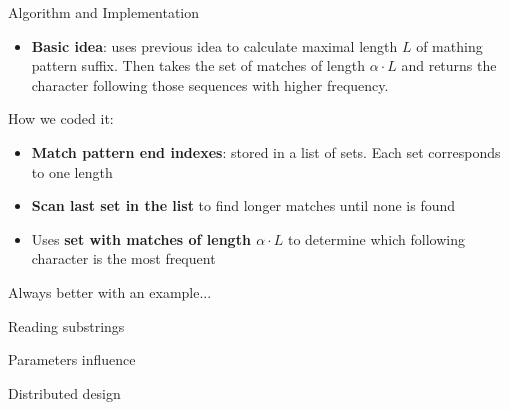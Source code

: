 \documentclass[aspectratio=169]{beamer}
\begin{document}

\begin{frame}{Algorithm and Implementation}
   \begin{itemize}
    \item \textbf{Basic idea}: uses previous idea to calculate maximal length $L$ of mathing pattern suffix. Then takes the set of matches of length $\alpha \cdot L$ and returns the character following those sequences with higher frequency.
  \end{itemize}

  \vspace{\fill}

  How we coded it:
  \begin{itemize}
    \item \textbf{Match pattern end indexes}: stored in a list of sets. Each set corresponds to one length
    \item \textbf{Scan last set in the list} to find longer matches until none is found
    \item Uses \textbf{set with matches of length $\alpha \cdot L$} to determine which following character is the most frequent
  \end{itemize}
  \vspace{\fill}

    Always better with an example...

\end{frame}

\begin{frame}{Example}\centering
  

  $$\text{ Set}=\{ 7,19,23 \}$$}
\end{frame}


\begin{frame}{Reading substrings}\centering
  
\end{frame}


\begin{frame}{Parameters influence}
\end{frame}

\begin{frame}{Distributed design}
\end{frame}

\end{document}
